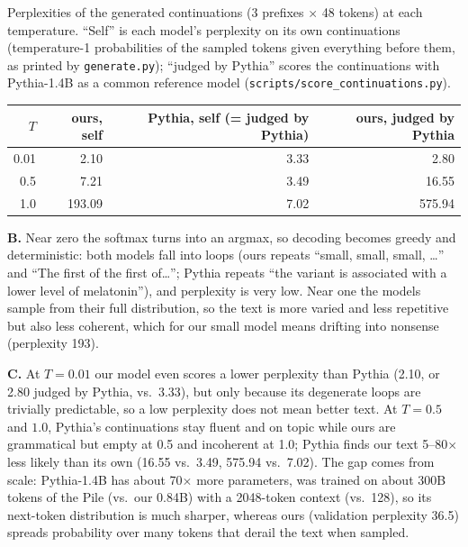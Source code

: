 \documentclass[11pt]{article}
\begin{document}
Perplexities of the generated continuations (3 prefixes $\times$ 48 tokens) at each temperature. ``Self'' is each model's perplexity on its own continuations (temperature-1 probabilities of the sampled tokens given everything before them, as printed by \texttt{generate.py}); ``judged by Pythia'' scores the continuations with Pythia-1.4B as a common reference model (\texttt{scripts/score\_continuations.py}).
\begin{center}
\begin{tabular}{rrrr}
\toprule
$T$ & ours, self & Pythia, self (= judged by Pythia) & ours, judged by Pythia \\
\midrule
0.01 & 2.10 & 3.33 & 2.80 \\
0.5 & 7.21 & 3.49 & 16.55 \\
1.0 & 193.09 & 7.02 & 575.94 \\
\bottomrule
\end{tabular}
\end{center}

\textbf{B.} Near zero the softmax turns into an argmax, so decoding becomes greedy and deterministic: both models fall into loops (ours repeats ``small, small, small, \ldots'' and ``The first of the first of\ldots''; Pythia repeats ``the variant is associated with a lower level of melatonin''), and perplexity is very low. Near one the models sample from their full distribution, so the text is more varied and less repetitive but also less coherent, which for our small model means drifting into nonsense (perplexity 193).

\textbf{C.} At $T=0.01$ our model even scores a lower perplexity than Pythia (2.10, or 2.80 judged by Pythia, vs.\ 3.33), but only because its degenerate loops are trivially predictable, so a low perplexity does not mean better text. At $T=0.5$ and $1.0$, Pythia's continuations stay fluent and on topic while ours are grammatical but empty at 0.5 and incoherent at 1.0; Pythia finds our text 5--80$\times$ less likely than its own (16.55 vs.\ 3.49, 575.94 vs.\ 7.02). The gap comes from scale: Pythia-1.4B has about 70$\times$ more parameters, was trained on about 300B tokens of the Pile (vs.\ our 0.84B) with a 2048-token context (vs.\ 128), so its next-token distribution is much sharper, whereas ours (validation perplexity 36.5) spreads probability over many tokens that derail the text when sampled.
\end{document}
